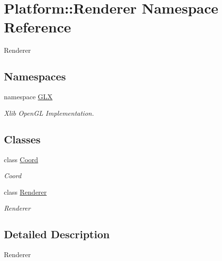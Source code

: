 \hypertarget{namespacePlatform_1_1Renderer}{
\section{Platform::Renderer Namespace Reference}
\label{namespacePlatform_1_1Renderer}
}


Renderer  
\subsection*{Namespaces}
\begin{DoxyCompactItemize}
\item 
namespace \hyperlink{namespacePlatform_1_1Renderer_1_1GLX}{GLX}


\begin{DoxyCompactList}\small\item\em Xlib OpenGL Implementation. \item\end{DoxyCompactList}\end{DoxyCompactItemize}
\subsection*{Classes}
\begin{DoxyCompactItemize}
\item 
class \hyperlink{classPlatform_1_1Renderer_1_1Coord}{Coord}
\begin{DoxyCompactList}\small\item\em Coord \item\end{DoxyCompactList}\item 
class \hyperlink{classPlatform_1_1Renderer_1_1Renderer}{Renderer}
\begin{DoxyCompactList}\small\item\em Renderer \item\end{DoxyCompactList}\end{DoxyCompactItemize}


\subsection{Detailed Description}
Renderer 